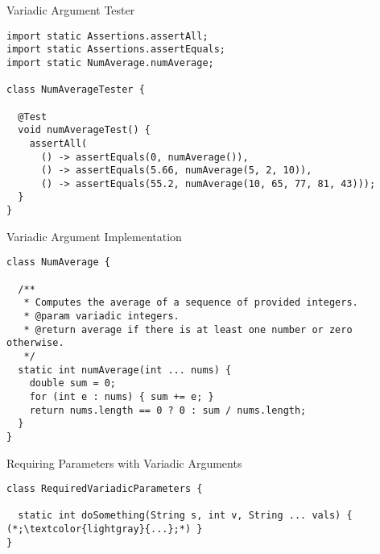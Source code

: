 \begin{cl}[]{Variadic Argument  Tester}
\begin{lstlisting}[language=MyJava]
import static Assertions.assertAll;
import static Assertions.assertEquals;
import static NumAverage.numAverage;

class NumAverageTester {

  @Test
  void numAverageTest() {
    assertAll(
      () -> assertEquals(0, numAverage()),
      () -> assertEquals(5.66, numAverage(5, 2, 10)),
      () -> assertEquals(55.2, numAverage(10, 65, 77, 81, 43)));
  }
}
\end{lstlisting}
\end{cl}

\begin{cl}[]{Variadic Argument  Implementation}
\begin{lstlisting}[language=MyJava]
class NumAverage {

  /**
   * Computes the average of a sequence of provided integers.
   * @param variadic integers.
   * @return average if there is at least one number or zero otherwise.
   */
  static int numAverage(int ... nums) {
    double sum = 0;
    for (int e : nums) { sum += e; }
    return nums.length == 0 ? 0 : sum / nums.length;
  }
}
\end{lstlisting}
\end{cl}


\begin{cl}[]{Requiring Parameters with Variadic Arguments}
\begin{lstlisting}[language=MyJava]
class RequiredVariadicParameters {

  static int doSomething(String s, int v, String ... vals) { (*;\textcolor{lightgray}{...};*) }
}
\end{lstlisting}
\end{cl}

